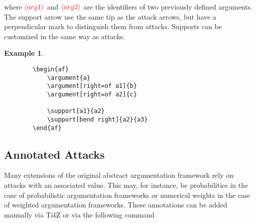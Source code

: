 \documentclass[headings=normal]{scrartcl}
\newcommand{\tikzname}{Ti\emph{k}Z\xspace}
\newcommand{\opt}[2][red]{\ensuremath{\textcolor{#1}{\langle #2\rangle}}}
\newtheorem{example}{Example}
\begin{document}
    \begin{list}{}{\leftmargin=\parindent\rightmargin=0pt}
    \item where \opt{arg1} and \opt{arg2} are the identifiers of two previously defined arguments.
    The support arrow use the same tip as the attack arrows, but have a perpendicular mark to distinguish them from attacks.
    Supports can be customized in the same way as attacks.
    \end{list}
    \begin{example}~

    \begin{minipage}{0.4\textwidth}
        \begin{center}
        \begin{af}
    
        \end{af}    
        \end{center}
    \end{minipage}%
    \begin{minipage}{0.5\textwidth}
        \begin{verbatim}
        \begin{af}
            \argument{a}
            \argument[right=of a1]{b}
            \argument[right=of a2]{c}
    
            \support{a1}{a2}
            \support[bend right]{a2}{a3}
        \end{af}
        \end{verbatim}
    \end{minipage}
    \end{example}


\subsection{Annotated Attacks}
    Many extensions of the original abstract argumentation framework rely on attacks with an associated value.
    This may, for instance, be probabilities in the case of probabilistic argumentation frameworks or numerical weights in the case of weighted argumentation frameworks.
    These annotations can be added manually via \tikzname or via the following command\\
    
\end{document}
